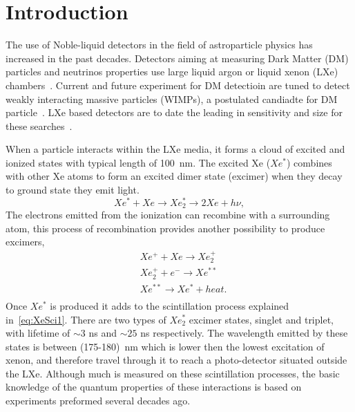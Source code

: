 \section{Introduction}
\label{sec:Intro}

The use of Noble-liquid detectors in the field of astroparticle physics has increased in the past decades. 
Detectors aiming at measuring Dark Matter (DM) particles and neutrinos properties use large liquid argon or 
liquid xenon (LXe) chambers~\cite{Aprile:2009dv,Rubbia:2013tpa}. Current and future experiment for DM detectioin 
are tuned to detect weakly interacting massive particles (WIMPs), a postulated candiadte for DM particle~\cite{Bertone:2010zza}. 
LXe based detectors are to date the leading in sensitivity and size for these searches~\cite{Aprile:2017iyp,Akerib:2016vxi,Fu:2016ega,Aalbers:2016jon}. 

When a particle interacts within the LXe media, it forms a cloud of excited and ionized states with typical length of 100~nm. 
The excited Xe ($Xe^*$) combines with other Xe atoms to form an excited dimer state (excimer) when they decay to ground state they emit light. 
\begin{equation} \label{eq:XeSci1}
 Xe^*+Xe \rightarrow Xe^*_2 \rightarrow 2Xe + h \nu , 
\end{equation}
The electrons emitted from the ionization can recombine with a surrounding atom, this process of recombination provides another possibility to produce excimers,
\begin{equation} \label{eq:XeSci2}
\begin{split}
  &Xe^{+} + Xe \rightarrow Xe^{+}_2 \\
  &Xe^{+}_2 + e^{-}  \rightarrow Xe^{**} \\
  &Xe^{**}   \rightarrow Xe^* + heat .\\
  \end{split}
\end{equation}  
Once $Xe^*$ is produced it adds to the scintillation process explained in~\ref{eq:XeSci1}. There are two types of $Xe^*_2$ excimer states, 
singlet and triplet, with lifetime of $\sim3$ ns and $\sim25$ ns respectively. The wavelength emitted by these states is between (175-180)~nm 
which is lower then the lowest excitation of xenon, and therefore travel through it to reach a photo-detector situated outside the LXe. Although 
much is measured on these scintillation processes, the basic knowledge of the quantum properties of these interactions is based on experiments 
preformed several decades ago.

